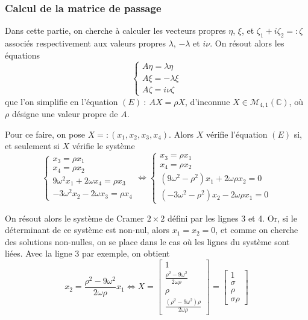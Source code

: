 \documentclass[12pt]{article}
\theoremstyle{definition}
\theoremstyle{definition}
\begin{document}
	
	\subsubsection{Calcul de la matrice de passage}
	Dans cette partie, on cherche à calculer les vecteurs propres $\eta$, $\xi$, et $\zeta_1 + i\zeta_2 =: \zeta$ associés respectivement aux valeurs propres $\lambda$, $-\lambda$ et $i\nu$.
	On résout alors les équations
	\begin{equation}
		\label{eq aux vps}
		\begin{cases}
			A\eta = \lambda \eta
			\\
			A\xi = -\lambda \xi
			\\
			A\zeta = i\nu \zeta
		\end{cases}
	\end{equation}
	que l'on simplifie en l'équation $(E) \ : \ AX = \rho X$, d'inconnue $X \in \mathcal{M}_{4,1}(\mathbb{C})$, où $\rho$ désigne une valeur propre de $A$.
	
	Pour ce faire, on pose $X =: (x_1, x_2, x_3, x_4)$. Alors $X$ vérifie l'équation $(E)$ si, et seulement si $X$ vérifie le système
	\begin{equation}
		\begin{cases}
			x_3 = \rho x_1
			\\
			x_4 = \rho x_2
			\\
			9\omega^2 x_1 + 2\omega x_4 = \rho x_3
			\\
			-3\omega^2 x_2 -2\omega x_3 = \rho x_4	
		\end{cases}
		\iff
		\begin{cases}
			x_3 = \rho x_1
			\\
			x_4 = \rho x_2
			\\
			(9\omega^2-\rho^2) x_1 + 2\omega \rho x_2 = 0
			\\
			(-3\omega^2-\rho^2) x_2 -2\omega \rho x_1 =	0
		\end{cases}
	\end{equation}
	
	On résout alors le système de Cramer $2\times 2$ défini par les lignes 3 et 4. Or, si le déterminant de ce système est non-nul, alors $x_1 = x_2 = 0$, et comme on cherche des solutions non-nulles, on se place dans le cas où les lignes du système sont liées. Avec la ligne 3 par exemple, on obtient
	\begin{equation*}
		x_2 = \frac{\rho^2-9\omega^2}{2\omega \rho}x_1
		\iff
		X = \begin{bmatrix}
			1
			\\ 
			\frac{\rho^2-9\omega^2}{2\omega \rho}
			\\
			\rho
			\\
			\frac{(\rho^2-9\omega^2)\rho}{2\omega \rho}
		\end{bmatrix}
		= \begin{bmatrix}
			1
			\\
			\sigma
			\\
			\rho
			\\
			\sigma \rho
		\end{bmatrix}
	\end{equation*}
	
\end{document}
